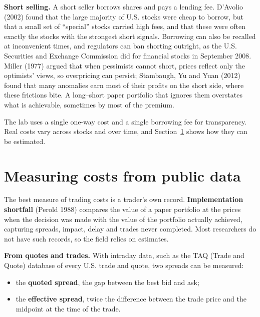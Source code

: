 \textbf{Short selling.} A short seller borrows shares and pays a lending fee. D'Avolio (2002) found that the large majority of U.S. stocks were cheap to borrow, but that a small set of ``special'' stocks carried high fees, and that these were often exactly the stocks with the strongest short signals. Borrowing can also be recalled at inconvenient times, and regulators can ban shorting outright, as the U.S. Securities and Exchange Commission did for financial stocks in September 2008. Miller (1977) argued that when pessimists cannot short, prices reflect only the optimists' views, so overpricing can persist; Stambaugh, Yu and Yuan (2012) found that many anomalies earn most of their profits on the short side, where these frictions bite. A long--short paper portfolio that ignores them overstates what is achievable, sometimes by most of the premium.

The lab uses a single one-way cost and a single borrowing fee for transparency. Real costs vary across stocks and over time, and Section~\ref{sec:06-measuring} shows how they can be estimated.

\section{Measuring costs from public data}
\label{sec:06-measuring}

The best measure of trading costs is a trader's own record. \textbf{Implementation shortfall} (Perold 1988) compares the value of a paper portfolio at the prices when the decision was made with the value of the portfolio actually achieved, capturing spreads, impact, delay and trades never completed. Most researchers do not have such records, so the field relies on estimates.

\textbf{From quotes and trades.} With intraday data, such as the TAQ (Trade and Quote) database of every U.S. trade and quote, two spreads can be measured:

\begin{itemize}
  \item the \textbf{quoted spread}, the gap between the best bid and ask;
  \item the \textbf{effective spread}, twice the difference between the trade price and the midpoint at the time of the trade.
\end{itemize}

